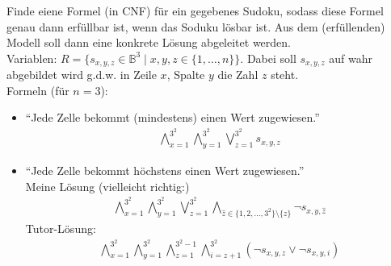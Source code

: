 \documentclass[12pt,a4paper]{article}
\begin{document}
\begin{aufgabe}
Finde eiene Formel (in CNF) für ein gegebenes Sudoku, sodass diese Formel genau dann erfüllbar ist, wenn das Soduku lösbar ist. Aus dem (erfüllenden) Modell soll dann eine konkrete Lösung abgeleitet werden.\\
Variablen: $R=\big\lbrace s_{x,y,z}\in\mathbb{B}^3\mid x,y,z\in\lbrace 1,\ldots,n\rbrace\big\rbrace$. Dabei soll $s_{x,y,z}$ auf wahr abgebildet wird g.d.w. in Zeile $x$, Spalte $y$ die Zahl $z$ steht.\\
Formeln (für $n=3$):
\begin{itemize}
\item ``Jede Zelle bekommt (mindestens) einen Wert zugewiesen.''
\begin{align*}
\bigwedge\limits_{x=1}^{3^2}\bigwedge\limits_{y=1}^{3^2}\bigvee\limits_{z=1}^{3^2} s_{x,y,z}
\end{align*}
\item ``Jede Zelle bekommt höchstens einen Wert zugewiesen.''\\
Meine Lösung (vielleicht richtig:)
\begin{align*}
\bigwedge\limits_{x=1}^{3^2}\bigwedge\limits_{y=1}^{3^2}\bigvee\limits_{z=1}^{3^2}\bigwedge\limits_{\hat{z}\in\lbrace1,2,\ldots,3^2\rbrace\setminus\lbrace z\rbrace} \neg s_{x,y,\hat{z}}
\end{align*}
Tutor-Lösung:
\begin{align*}
\bigwedge\limits_{x=1}^{3^2}
\bigwedge\limits_{y=1}^{3^2}
\bigwedge\limits_{z=1}^{3^2-1}
\bigwedge\limits_{i=z+1}^{3^2}
(\neg s_{x,y,z}\vee\neg s_{x,y,i})
\end{align*}


\end{itemize}
\end{aufgabe}
\end{document}
